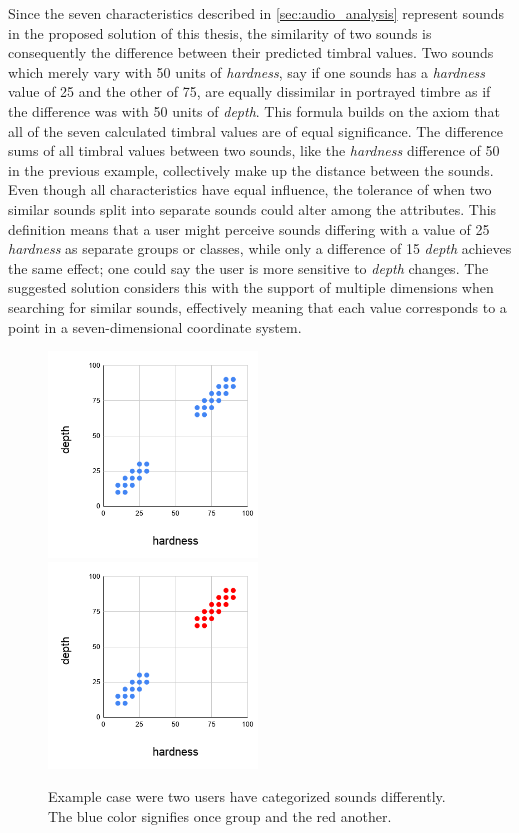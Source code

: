 Since the seven characteristics described in \cref{sec:audio_analysis} represent sounds in the proposed solution of this thesis, the similarity of two sounds is consequently the difference between their predicted timbral values. Two sounds which merely vary with 50 units of \emph{hardness}, say if one sounds has a \emph{hardness} value of 25 and the other of 75, are equally dissimilar in portrayed timbre as if the difference was with 50 units of \emph{depth}. This formula builds on the axiom that all of the seven calculated timbral values are of equal significance. The difference sums of all timbral values between two sounds, like the \emph{hardness} difference of 50 in the previous example, collectively make up the distance between the sounds. Even though all characteristics have equal influence, the tolerance of when two similar sounds split into separate sounds could alter among the attributes. This definition means that a user might perceive sounds differing with a value of 25 \emph{hardness} as separate groups or classes, while only a difference of 15 \emph{depth} achieves the same effect; one could say the user is more sensitive to \emph{depth} changes. The suggested solution considers this with the support of multiple dimensions when searching for similar sounds, effectively meaning that each value corresponds to a point in a seven-dimensional coordinate system.
\begin{figure}[ht]
    \includegraphics[width=0.495\textwidth]{figures/methods/chart-a}
    \includegraphics[width=0.495\textwidth]{figures/methods/chart-b}
    \caption[Example case were two users have categorized sounds differently.]{Example case were two users have categorized sounds differently. The {\color{blue}blue} color signifies once group and the {\color{red}red} another.}\label{fig:methods/charts}
\end{figure}

